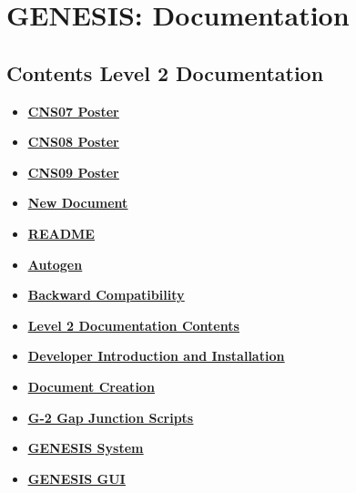 \documentclass[12pt]{article}
\begin{document}
\section*{GENESIS: Documentation}

\subsection*{Contents Level 2 Documentation}

\begin{itemize}

\item \href{../CNS07/CNS07.pdf}{\bf \underline{CNS07 Poster}}

\item \href{../CNS08/CNS08.pdf}{\bf \underline{CNS08 Poster}}

\item \href{../CNS09/CNS09.pdf}{\bf \underline{CNS09 Poster}}

\item \href{../NewDocument/NewDocument.pdf}{\bf \underline{New Document}}

\item \href{../README/README.pdf}{\bf \underline{README}}

\item \href{../autogen/autogen.pdf}{\bf \underline{Autogen}}

\item \href{../backward-compatibility/backward-compatibility.pdf}{\bf \underline{Backward Compatibility}}

\item \href{../contents-level2/contents-level2.pdf}{\bf \underline{Level 2 Documentation Contents}}

\item \href{../developers-intro/developers-intro.pdf}{\bf \underline{Developer Introduction and Installation}}

\item \href{../document-create/document-create.pdf}{\bf \underline{Document Creation}}

\item \href{../g2-gap-junction/g2-gap-junction.pdf}{\bf \underline{G-2 Gap Junction Scripts}}

\item \href{../genesis-system/genesis-system.pdf}{\bf \underline{GENESIS System}}

\item \href{../gui/gui.pdf}{\bf \underline{GENESIS GUI}}


\end{itemize}
\end{document}
